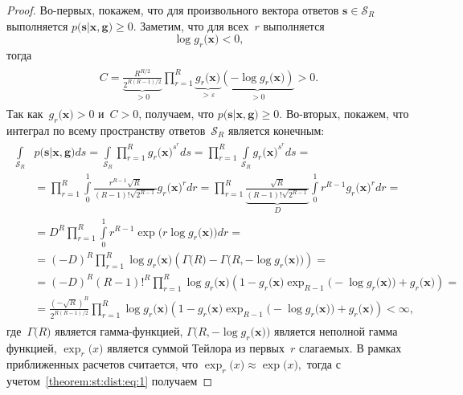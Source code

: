 \begin{proof}
	Во-первых, покажем, что для произвольного вектора ответов $\mathbf{s} \in \mathcal{S}_R$ выполняется $p\bigr(\mathbf{s}|\mathbf{x}, \mathbf{g}\bigr) \geq 0$. Заметим, что для всех~$r$ выполняется
	\[\log g_r\bigr(\mathbf{x}\bigr) < 0,\] тогда
\begin{gather}
\begin{aligned}
	C=\underbrace{\frac{R^{R/2}}{2^{R(R-1)/2}}}_{>0}\prod_{r=1}^{R}\underbrace{g_r\bigr(\mathbf{x}\bigr)}_{>\varepsilon}\underbrace{\left(-\log g_r\bigr(\mathbf{x}\bigr)\right)}_{>0} > 0.
\end{aligned}
\end{gather}
Так как~$g_r\bigr(\mathbf{x}\bigr) >0$ и~$C>0$, получаем, что $p\bigr(\mathbf{s}|\mathbf{x}, \mathbf{g}\bigr) \geq 0$.
	Во-вторых, покажем, что интеграл по всему пространству ответов~$\mathcal{S}_R$ является конечным:
	\begin{gather}
	\label{theorem:st:dist:eq:1}
	\begin{aligned}
		\int\limits_{\mathcal{S}_R}&p\bigr(\mathbf{s}|\mathbf{x}, \mathbf{g}\bigr)ds = \int\limits_{\mathcal{S}_R}\prod_{r=1}^{R}g_r\bigr(\mathbf{x}\bigr)^{s^r}ds = \prod_{r=1}^{R}\int\limits_{\mathcal{S}_R}g_r\bigr(\mathbf{x}\bigr)^{s^r}ds =\\ 
		& = \prod_{r=1}^{R}\int\limits_{0}^{1}\frac{r^{R-1}\sqrt{R}}{\left(R-1\right)!\sqrt{2^{R-1}}}g_r\bigr(\mathbf{x}\bigr)^{r}dr = \prod_{r=1}^{R}\underbrace{\frac{\sqrt{R}}{\left(R-1\right)!\sqrt{2^{R-1}}}}_{D}\int\limits_{0}^{1}r^{R-1}g_r\bigr(\mathbf{x}\bigr)^{r}dr =\\
		& = D^R\prod_{r=1}^{R} \int\limits_{0}^{1}r^{R-1}\exp\bigr(r\log g_r\bigr(\mathbf{x}\bigr)\bigr)dr =\\
		& = \left(-D\right)^R\prod_{r=1}^{R}\log g_r\bigr(\mathbf{x}\bigr)\left(\Gamma\bigr(R\bigr) - \Gamma\bigr(R, -\log g_r\bigr(\mathbf{x}\bigr)\bigr)\right) =\\
		& = \left(-D\right)^R\left(R-1\right)!^R\prod_{r=1}^{R}\log g_r\bigr(\mathbf{x}\bigr)\left(1 -g_r\bigr(\mathbf{x}\bigr) \exp_{R-1}\bigr(-\log g_r\bigr(\mathbf{x}\bigr)\bigr)+g_r\bigr(\mathbf{x}\bigr)\right) =\\
		& = \frac{\left(-\sqrt{R}\right)^R}{2^{R(R-1)/2}}\prod_{r=1}^{R}\log g_r\bigr(\mathbf{x}\bigr)\left(1 -g_r\bigr(\mathbf{x}\bigr) \exp_{R-1}\bigr(-\log g_r\bigr(\mathbf{x}\bigr)\bigr)+g_r\bigr(\mathbf{x}\bigr)\right) < \infty,
	\end{aligned}
	\end{gather}
где~$\Gamma\bigr(R\bigr)$ является гамма-функцией, $\Gamma\bigr(R, -\log g_r\bigr(\mathbf{x}\bigr)\bigr)$ является неполной гамма функцией, $\exp_{r}\bigr(x\bigr)$ является суммой Тейлора из первых~$r$ слагаемых. В рамках приближенных расчетов считается, что $\exp_{r}\bigr(x\bigr)\approx\exp\bigr(x\bigr),$ тогда с учетом~\eqref{theorem:st:dist:eq:1} получаем

\end{proof}
